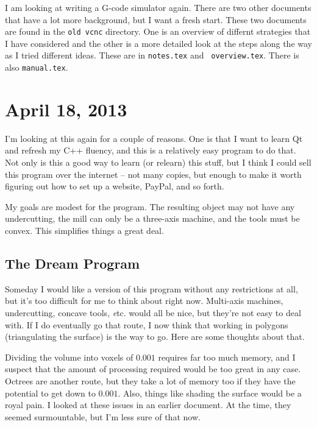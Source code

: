 \documentclass[titlepage,oneside,10pt]{article}
\begin{document}
\raggedbottom

\newcommand{\mymargin}[1]{\marginpar{\rm\tiny #1}}
\newcommand{\leftmar}[1]{\reversemarginpar \mymargin{#1}}

I am looking at writing a G-code simulator again. There are two other
documents that have a lot more background, but I want a fresh
start. These two documents are found in the {\tt old vcnc} directory. One is an
overview of differnt strategies that I have considered and the other
is a more detailed look at the steps along the way as I tried
different ideas. These are in {\tt notes.tex} and {\tt
  overview.tex}. There is also {\tt manual.tex}.

\section{April 18, 2013}

I'm looking at this again for a couple of reasons. One is that I want
to learn Qt and refresh my C++ fluency, and this is a relatively easy
program to do that. Not only is this a good way to learn (or relearn)
this stuff, but I think I could sell this program over the internet --
not many copies, but enough to make it worth figuring out how to set
up a website, PayPal, and so forth.

My goals are modest for the program. The resulting object may not have
any undercutting, the mill can only be a three-axis machine, and the
tools must be convex. This simplifies things a great deal.

\subsection{The Dream Program}

Someday I would like a version of this program without any
restrictions at all, but it's too difficult for me to think about
right now. Multi-axis machines, undercutting, concave tools, {\emph
  etc}. would all be nice, but they're not easy to deal with. If I do
eventually go that route, I now think that working in polygons
(triangulating the surface) is the way to go. Here are some thoughts
about that.

Dividing the volume into voxels of $0.001$ requires far too much
memory, and I suspect that the amount of processing required would be
too great in any case. Octrees are another route, but they take a lot
of memory too if they have the potential to get down to $0.001$. Also,
things like shading the surface would be a royal pain. I looked at
these issues in an earlier document. At the time, they seemed
surmountable, but I'm less sure of that now.
\end{document}
